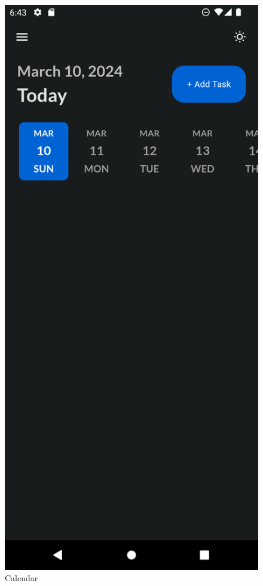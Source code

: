 \documentclass{l4proj}
\begin{document}
\begin{figure}
\begin{minipage}{.5\textwidth}
  \includegraphics[width=.6\linewidth]{images/Calander.png}

  \caption{Calendar}
    \label{fig:Calendar}
\end{minipage}
\end{figure}
\end{document}
